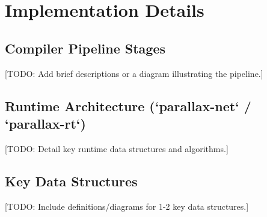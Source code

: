 \section{Implementation Details} %

\subsection{Compiler Pipeline Stages} %
[TODO: Add brief descriptions or a diagram illustrating the pipeline.]

\subsection{Runtime Architecture (`parallax-net` / `parallax-rt`)} %
[TODO: Detail key runtime data structures and algorithms.]

\subsection{Key Data Structures} %
[TODO: Include definitions/diagrams for 1-2 key data structures.]

